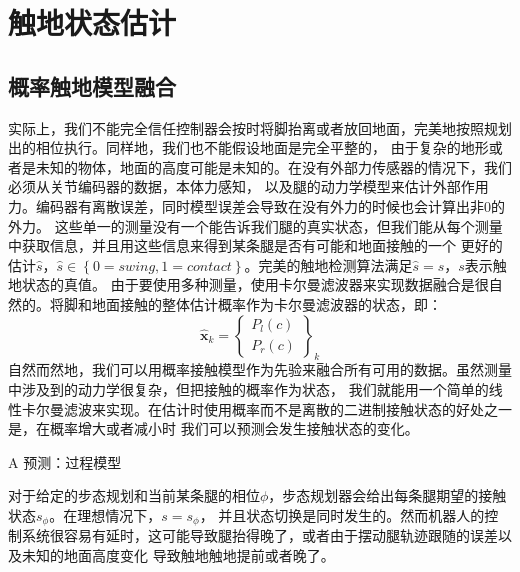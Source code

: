 \section{触地状态估计}
\subsection{概率触地模型融合}
实际上，我们不能完全信任控制器会按时将脚抬离或者放回地面，完美地按照规划出的相位执行。同样地，我们也不能假设地面是完全平整的，
由于复杂的地形或者是未知的物体，地面的高度可能是未知的。在没有外部力传感器的情况下，我们必须从关节编码器的数据，本体力感知，
以及腿的动力学模型来估计外部作用力。编码器有离散误差，同时模型误差会导致在没有外力的时候也会计算出非0的外力。
这些单一的测量没有一个能告诉我们腿的真实状态，但我们能从每个测量中获取信息，并且用这些信息来得到某条腿是否有可能和地面接触的一个
更好的估计$\hat s$，$\hat s \in \left\{0=swing, 1=contact\right\}$。完美的触地检测算法满足$\hat s = s$，$s$表示触地状态的真值。
由于要使用多种测量，使用卡尔曼滤波器来实现数据融合是很自然的。将脚和地面接触的整体估计概率作为卡尔曼滤波器的状态，即：
\begin{equation}
    \label{equ:est_state}
    \hat{\boldsymbol{x}}_k=\left\{\begin{array}{c}
        P_l(c) \\
        P_r(c)
        \end{array}\right\}_k
\end{equation}
自然而然地，我们可以用概率接触模型作为先验来融合所有可用的数据。虽然测量中涉及到的动力学很复杂，但把接触的概率作为状态，
我们就能用一个简单的线性卡尔曼滤波来实现。在估计时使用概率而不是离散的二进制接触状态的好处之一是，在概率增大或者减小时
我们可以预测会发生接触状态的变化。

A 预测：过程模型

对于给定的步态规划和当前某条腿的相位$\phi$，步态规划器会给出每条腿期望的接触状态$s_{\phi}$。在理想情况下，$s = s_{\phi}$，
并且状态切换是同时发生的。然而机器人的控制系统很容易有延时，这可能导致腿抬得晚了，或者由于摆动腿轨迹跟随的误差以及未知的地面高度变化
导致触地触地提前或者晚了。

